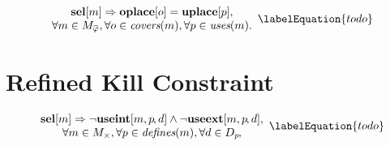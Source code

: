 \begin{equation}
  \begin{array}{c}
    \mVar{sel}[m] \mImp \mVar{oplace}[o] = \mVar{uplace}[p], \\
    \forall m \in \mPhiMatchCompSet,
    \forall o \in \mCovers(m),
    \forall p \in \mUses(m).
  \end{array}
  \labelEquation{todo}
\end{equation}


\section{Refined Kill Constraint}



\begin{equation}
  \begin{array}{c}
    \mVar{sel}[m]
    \mImp
    \neg\mVar{useint}[m, p \hspace{-1pt}, d]
    \mAnd
    \neg\mVar{useext}[m, p \hspace{-1pt}, d], \\
    \forall m \in \mKillMatchSet,
    \forall p \in \mDefines(m),
    \forall d \in \mDataSet[p] \hspace{-1pt},
  \end{array}
  \labelEquation{todo}
\end{equation}

